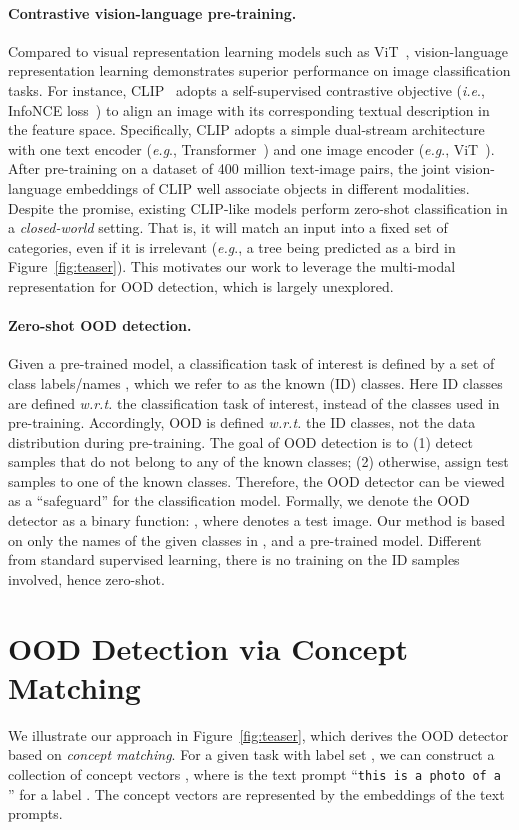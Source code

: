 \documentclass{article}
\def\ie{\emph{i.e}., }
\def\eg{\emph{e.g}., }
\begin{document}
\paragraph{Contrastive vision-language pre-training.}
Compared to visual representation learning models such as ViT~\cite{dosovitskiy2021an}, vision-language representation learning demonstrates superior performance on image classification tasks. For instance, CLIP~\cite{radford2021learning} adopts a self-supervised contrastive objective (\ie InfoNCE loss~\cite{van2018representation}) to align an image with its corresponding textual description in the feature space. 
Specifically, CLIP adopts a simple dual-stream architecture with one text encoder  (\eg Transformer~\cite{vaswani2017attention}) and one image encoder  (\eg ViT~\cite{dosovitskiy2021an}). After pre-training on a dataset of 400 million text-image pairs, the joint vision-language embeddings of CLIP well associate objects in different modalities. Despite the promise, existing CLIP-like models perform zero-shot classification in a \emph{closed-world} setting. That is, it will match an input into a fixed set of categories, even if it is irrelevant (\eg  a tree being predicted as a bird in Figure~\ref{fig:teaser}). This motivates our work to leverage the multi-modal representation for OOD detection, which is largely unexplored.

\paragraph{Zero-shot OOD detection.} 
Given a pre-trained model, a classification task of interest is defined by a set of
class labels/names , which we refer to as the known (ID) classes. Here ID classes are defined \emph{w.r.t.} the classification task of interest, instead of the classes used in pre-training.
Accordingly, OOD is defined \emph{w.r.t.} the ID classes, not the data distribution during pre-training. The goal of OOD detection
is to (1) detect samples that do not belong to any of the
known classes; (2) otherwise, assign test samples to one of the known
classes. Therefore, the OOD detector can be viewed as a ``safeguard'' for the classification model. Formally, we denote the OOD detector as a binary function: ,
where  denotes a test image. 
Our method is based on only the names of the
given classes in , and a pre-trained model. Different from standard supervised learning, there is no training on the ID samples involved, hence zero-shot.


\section{OOD Detection via Concept Matching}
\label{sec:method}
We illustrate our approach in Figure~\ref{fig:teaser}, which derives the OOD detector  based on \emph{concept matching}. For a given task with label set , we can construct a collection of concept vectors , where  is the text prompt
``\texttt{this is a photo of a }''
for a label .
The concept vectors are represented by the embeddings of the text prompts.
\end{document}
